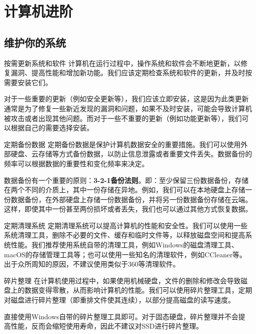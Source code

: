 \documentclass{beamer}
\begin{document}
\section{计算机进阶}

\subsection{维护你的系统}
\begin{frame}{按需更新系统和软件} 
    计算机在运行过程中，操作系统和软件会不断地更新，以修复漏洞、提高性能和增加新功能。我们应该定期检查系统和软件的更新，并及时按需要安装它们。

    对于一些重要的更新（例如安全更新等），我们应该立即安装，这是因为此类更新通常是为了修复一些新近发现的漏洞和问题，如果不及时安装，可能会导致计算机被攻击或者出现其他问题。而对于一些不重要的更新（例如功能更新等），我们可以根据自己的需要选择安装。
\end{frame}

\begin{frame}{定期备份数据}
    定期备份数据是保护计算机数据安全的重要措施。我们可以使用外部硬盘、云存储等方式备份数据，以防止信息泄露或者重要文件丢失。数据备份的频率可以根据数据的重要性和变化频率来决定。

    数据备份有一个重要的原则：\textbf{3-2-1备份法则}。即：至少保留三份数据备份，存储在两个不同的介质上，其中一份存储在异地。例如，我们可以在本地硬盘上存储一份数据备份，在外部硬盘上存储一份数据备份，并将另一份数据备份存储在云端。这样，即使其中一份甚至两份损坏或者丢失，我们也可以通过其他方式恢复数据。
\end{frame}

\begin{frame}{定期清理系统}
    定期清理系统可以提高计算机的性能和安全性。我们可以使用一些系统清理工具，删除不必要的文件、缓存和临时文件等，以释放磁盘空间和提高系统性能。我们推荐使用系统自带的清理工具，例如Windows的磁盘清理工具、macOS的存储管理工具等；也可以使用一些知名的清理软件，例如CCleaner等。出于众所周知的原因，不建议使用类似于360等清理软件。
\end{frame}

\begin{frame}{碎片整理}
    在计算机使用过程中，如果使用机械硬盘，文件的删除和修改会导致磁盘上的数据变得零散，从而影响计算机的性能。我们可以使用碎片整理工具，定期对磁盘进行碎片整理（即重排文件使其连续），以部分提高磁盘的读写速度。

    直接使用Windows自带的碎片整理工具即可。对于固态硬盘，碎片整理并不会提高性能，反而会缩短使用寿命，因此不建议对SSD进行碎片整理。
\end{frame}
\end{document}
